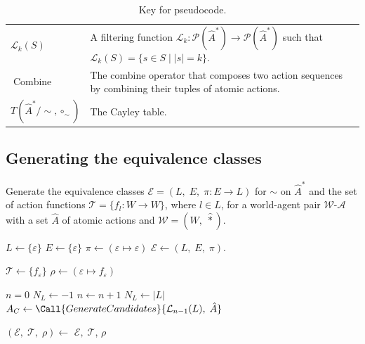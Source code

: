 \begin{table}[htbp]
\begin{fullwidth}
\begin{tabularx}{\linewidth}{lX}
      $\mathcal{L}_{k}(S)$               & A filtering function $\mathcal{L}_{k}: \mathcal{P}(\hat{A}^{*}) \to \mathcal{P}(\hat{A}^{*})$ such that $\mathcal{L}_{k}(S) = \{ s \in S \mid |s| = k \}$. \\
      $\operatorname{Combine}$           & The combine operator that composes two action sequences by combining their tuples of atomic actions. \\
      $T(\hat{A}^{*}/\sim, \circ_{\sim})$               & The Cayley table.\\
      \bottomrule
    \end{tabularx}
    \caption{Key for pseudocode.}
  \end{fullwidth}
\end{table}


\subsection{Generating the equivalence classes}

\begin{algorithm}[H]
\begin{fullwidth}
\caption{
Generate the equivalence classes $\mathcal{E} = (L, \; E, \; \pi: E \to L)$ for $\sim$ on $\hat{A}^{*}$ and the set of action functions $\mathcal{T} = \{f_{l}: W \to W\}$, where $l \in L$, for a world-agent pair $\mathscr{W}$-$\mathscr{A}$ with a set $\hat{A}$ of atomic actions and $\mathscr{W} = (W, \; \hat{\ast})$.
}
\label{alg:GenerateEquivClasses}
\hrulefill
\begin{algorithmic}[1]
    \Statex {}
    \State $L \gets \{\varepsilon\}$
    \State $E \gets \{\varepsilon\}$
    \State $\pi \gets (\varepsilon \mapsto \varepsilon)$
    \State $\mathcal{E} \gets (L, \; E, \; \pi)$.

    \Statex {}
    \State $\mathcal{T} \gets \{f_{\varepsilon}\}$
    \State $\rho \gets (\varepsilon \mapsto f_{\varepsilon})$

    \Statex {}
    \State $n = 0$
    \State $N_{L} \gets -1$
    \Statex {}
    \State $n \gets n + 1$
    \State $N_{L} \gets |L|$
    \State $A_{C} \gets \Call{GenerateCandidates}{\mathcal{L}_{n-1}(L), \;  \hat{A}}$

    \State $(\mathcal{E}, \; \mathcal{T}, \; \rho) \gets$ 
    \EndFor
    \EndWhile
    \State \Return $\mathcal{E}, \; \mathcal{T}$, \; $\rho$
    \EndFunction
\end{algorithmic}
\end{fullwidth}
\end{algorithm}


